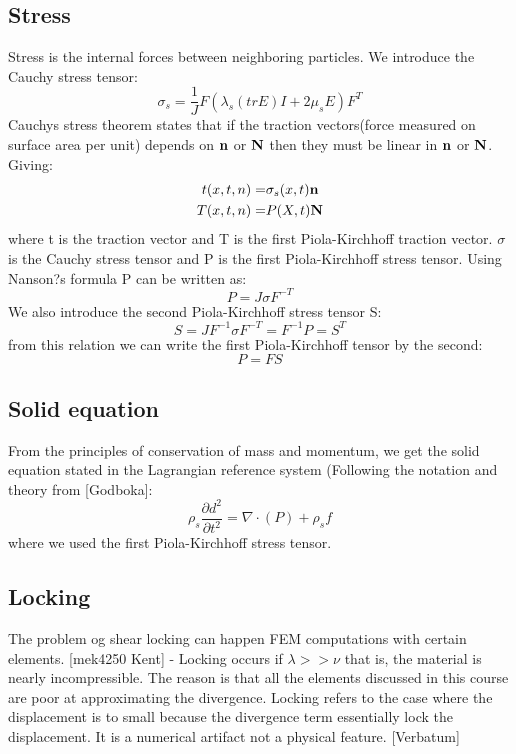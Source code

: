 \subsection*{Stress}
Stress is the internal forces between neighboring particles. We introduce the Cauchy stress tensor:
$$ \sigma_s = \frac{1}{J} F(\lambda_s (tr E)I + 2\mu_sE) F^T$$
Cauchys stress theorem states that if the traction vectors(force measured on surface area per unit) depends on $\bold{n}$ or $\bold{N}$ then they must be linear in $\bold{n}$ or $\bold{N}$. Giving: 
\begin{align*}
t(x,t,n) =& \sigma_s(x,t) \bold{n} \\
T(x,t,n) =& P(X,t) \bold{N} \\
\end{align*}
where t is the traction vector and T is the first Piola-Kirchhoff traction vector. $\sigma$ is the Cauchy stress tensor and P is the first Piola-Kirchhoff stress tensor. Using Nanson?s formula P can be written as:
$$ P = J \sigma F^{-T} $$
We also introduce the second Piola-Kirchhoff stress tensor S:
$$ S = J F^{-1}\sigma F^{-T} = F^{-1} P = S^T $$
from this relation we can write the first Piola-Kirchhoff tensor by the second:
$$ P = FS$$

\subsection*{Solid equation}
From the principles of conservation of mass and momentum, we get the solid equation stated in the Lagrangian reference system (Following the notation and theory from [Godboka]:
\begin{equation}
\rho_s \frac{\partial d^2}{\partial t^2} = \nabla \cdot ( P ) + \rho_s f 
\end{equation}
where we used the first Piola-Kirchhoff stress tensor.

\subsection*{Locking}
The problem og shear locking can happen FEM computations with certain elements. 
[mek4250 Kent] - Locking occurs if  $ \lambda >> \nu $ that is, the material is nearly incompressible. The reason is that all the elements discussed in this course are poor at approximating the divergence. Locking refers to the case where the displacement is to small because the divergence term essentially lock the displacement. It is a numerical artifact not a physical feature. [Verbatum]






